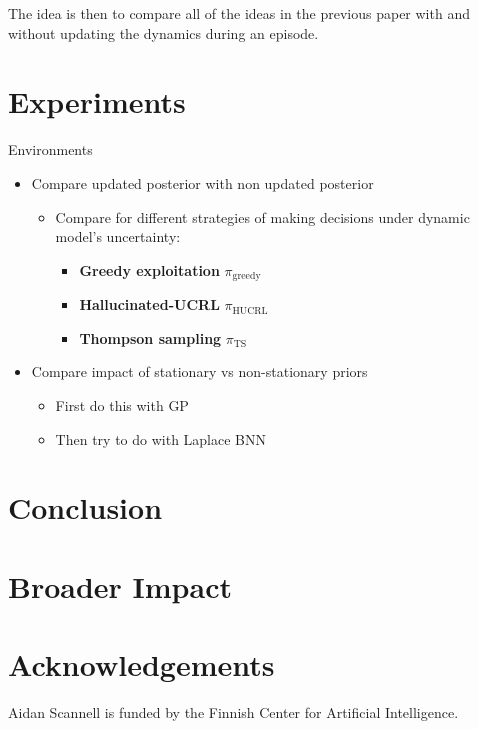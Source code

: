 \documentclass{article}
\begin{document}
The idea is then to compare all of the ideas in the previous paper with and without updating the dynamics during an episode.



\section{Experiments}
Environments
\begin{itemize}
  \item Compare updated posterior with non updated posterior
  \begin{itemize}
  \item Compare for different strategies of making decisions under dynamic model's uncertainty:
    \begin{itemize}
      \item \textbf{Greedy exploitation} \(\pi_{\text{greedy}}\)
      \item \textbf{Hallucinated-UCRL} \(\pi_{\text{HUCRL}}\)
      \item \textbf{Thompson sampling} \(\pi_{\text{TS}}\)
    \end{itemize}
  \end{itemize}
  \item Compare impact of stationary vs non-stationary priors
  \begin{itemize}
    \item First do this with GP
    \item Then try to do with Laplace BNN
  \end{itemize}
\end{itemize}

\section{Conclusion} \label{sec:conclusion}


\section*{Broader Impact}

\section*{Acknowledgements}
Aidan Scannell is funded by the Finnish Center for Artificial Intelligence.

\small
\printbibliography
\normalsize
\end{document}

